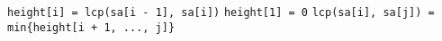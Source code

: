 
\verb|height[i] = lcp(sa[i - 1], sa[i])|
\verb|height[1] = 0|
\verb|lcp(sa[i], sa[j]) = min{height[i + 1, ..., j]}|